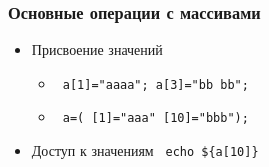 \begin{frame}[fragile]
\frametitle{Основные операции с массивами}
\begin{itemize}
\item Присвоение значений
 \begin{itemize}
   \item \verb+ a[1]="aaaa"; a[3]="bb bb";   +
   \item \verb+ a=( [1]="aaa" [10]="bbb"); +
 \end{itemize}
\item Доступ к значениям \verb+ echo ${a[10]} +
\end{itemize}
\end{frame}

